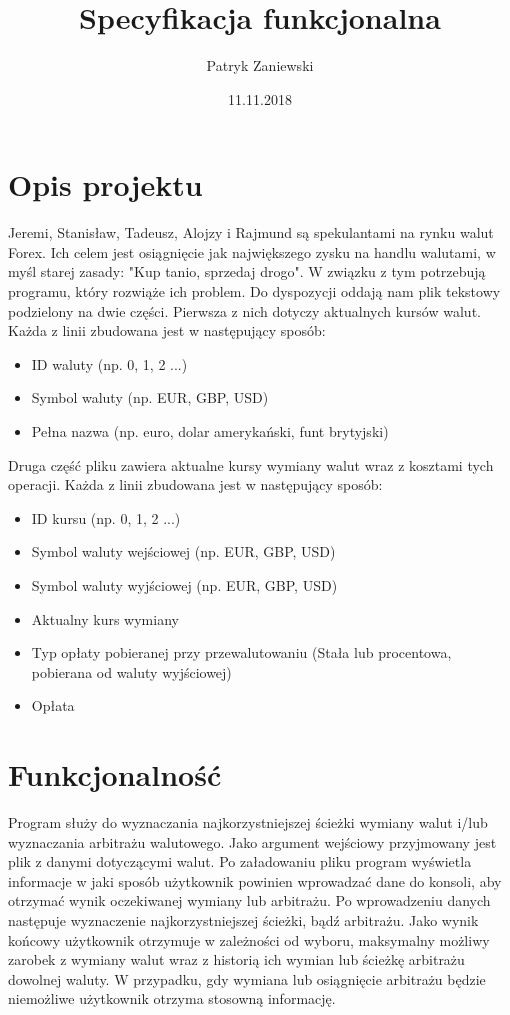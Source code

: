 ﻿\documentclass{article}
\title{Specyfikacja funkcjonalna}
\author{Patryk Zaniewski}
\date{11.11.2018}
\begin{document}
\maketitle
\tableofcontents
\newpage

\section{Opis projektu}
Jeremi, Stanisław, Tadeusz, Alojzy i Rajmund są spekulantami na rynku walut Forex. Ich celem jest osiągnięcie jak największego zysku na handlu walutami, w myśl starej zasady: "Kup tanio, sprzedaj drogo". W związku z tym potrzebują programu, który rozwiąże ich problem. Do dyspozycji oddają nam plik tekstowy podzielony na dwie części.
\newline\newline
Pierwsza z nich dotyczy aktualnych kursów walut. Każda z linii zbudowana jest w następujący sposób:
\begin{itemize}
    \item ID waluty (np. 0, 1, 2 ...)
    \item Symbol waluty (np. EUR, GBP, USD)
    \item Pełna nazwa (np. euro, dolar amerykański, funt brytyjski)
\end{itemize}
Druga część pliku zawiera aktualne kursy wymiany walut wraz z kosztami tych operacji. Każda z linii zbudowana jest w następujący sposób:
\begin{itemize}
    \item ID kursu (np. 0, 1, 2 ...)
    \item Symbol waluty wejściowej (np. EUR, GBP, USD)
    \item Symbol waluty wyjściowej (np. EUR, GBP, USD)
    \item Aktualny kurs wymiany
    \item Typ opłaty pobieranej przy przewalutowaniu (Stała lub procentowa, pobierana od waluty wyjściowej)
    \item Opłata
\end{itemize}

\section{Funkcjonalność}
Program służy do wyznaczania najkorzystniejszej ścieżki wymiany walut i/lub wyznaczania arbitrażu walutowego. 
\newline\newline Jako argument wejściowy przyjmowany jest plik z danymi dotyczącymi walut. Po załadowaniu pliku program wyświetla informacje w jaki sposób użytkownik powinien wprowadzać dane do konsoli, aby otrzymać wynik oczekiwanej wymiany lub arbitrażu. Po wprowadzeniu danych następuje wyznaczenie najkorzystniejszej ścieżki, bądź arbitrażu.
\newline\newline Jako wynik końcowy użytkownik otrzymuje w zależności od wyboru, maksymalny możliwy zarobek z wymiany walut wraz z historią ich wymian lub ścieżkę arbitrażu dowolnej waluty. W przypadku, gdy wymiana lub osiągnięcie arbitrażu będzie niemożliwe użytkownik otrzyma stosowną informację.
\end{document}

